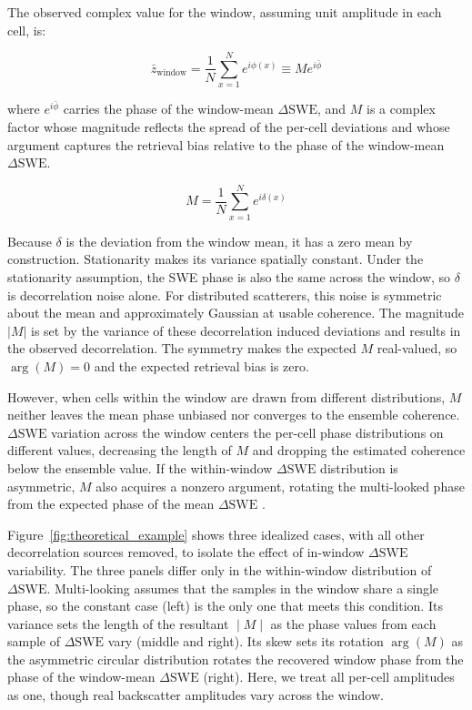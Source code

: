 \documentclass[tc, manuscript]{copernicus}
\begin{document}
\noindent The observed complex value for the window, assuming unit amplitude in each cell, is:

\begin{equation}\label{eq:z_window}
    \bar{z}_{\mathrm{window}}
      = \frac{1}{N} \sum_{x=1}^{N} e^{i\phi(x)}
      \equiv M e^{i\bar{\phi}}
\end{equation}

\noindent where $e^{i\bar{\phi}}$ carries the phase of the window-mean $\Delta\mathrm{SWE}$, and $M$ is a complex factor whose magnitude reflects the spread of the per-cell deviations and whose argument captures the retrieval bias relative to the phase of the window-mean $\Delta\mathrm{SWE}$.

\begin{equation}\label{eq:def_m}
    M = \frac{1}{N} \sum_{x=1}^{N} e^{i\delta(x)}
\end{equation}

Because $\delta$ is the deviation from the window mean, it has a zero mean by construction. Stationarity makes its variance spatially constant. Under the stationarity assumption, the SWE phase is also the same across the window, so $\delta$ is decorrelation noise alone. For distributed scatterers, this noise is symmetric about the mean and approximately Gaussian at usable coherence. The magnitude $|M|$ is set by the variance of these decorrelation induced deviations and results in the observed decorrelation. The symmetry makes the expected $M$ real-valued, so $\arg(M)=0$ and the expected retrieval bias is zero.

However, when cells within the window are drawn from different distributions, $M$ neither leaves the mean phase unbiased nor converges to the ensemble coherence. $\Delta\mathrm{SWE}$ variation across the window centers the per-cell phase distributions on different values, decreasing the length of $M$ and dropping the estimated coherence below the ensemble value. If the within-window $\Delta\mathrm{SWE}$ distribution is asymmetric, $M$ also acquires a nonzero argument, rotating the multi-looked phase from the expected phase of the mean $\Delta\mathrm{SWE}$ \citep{fischer1993}.

Figure~\ref{fig:theoretical_example} shows three idealized cases, with all other decorrelation sources removed, to isolate the effect of in-window $\Delta\mathrm{SWE}$ variability. The three panels differ only in the within-window distribution of $\Delta\mathrm{SWE}$. Multi-looking assumes that the samples in the window share a single phase, so the constant case (left) is the only one that meets this condition. Its variance sets the length of the resultant $∣M∣$ as the phase values from each sample of $\Delta\mathrm{SWE}$ vary (middle and right). Its skew sets its rotation $\arg(M)$ as the asymmetric circular distribution rotates the recovered window phase from the phase of the window-mean $\Delta\mathrm{SWE}$ (right). Here, we treat all per-cell amplitudes as one, though real backscatter amplitudes vary across the window.
\end{document}
